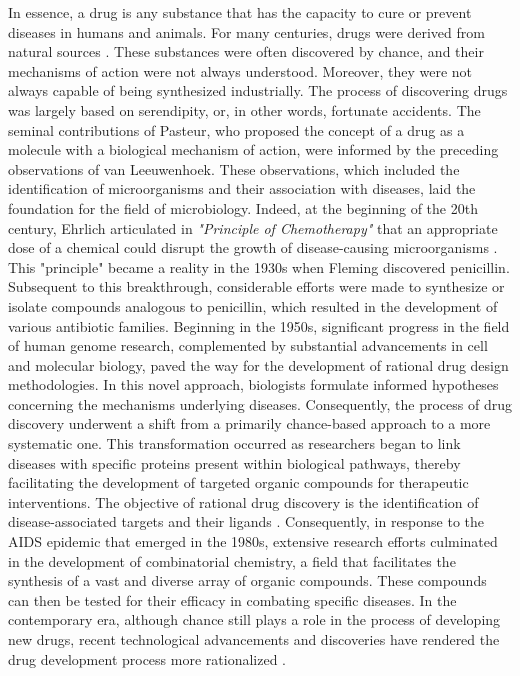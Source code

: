 In essence, a drug is any substance that has the capacity to cure or prevent diseases in humans and animals. For many centuries, drugs were derived from natural sources \cite{Schedler2006}. These substances were often discovered by chance, and their mechanisms of action were not always understood. Moreover, they were not always capable of being synthesized industrially. The process of discovering drugs was largely based on serendipity, or, in other words, fortunate accidents. The seminal contributions of Pasteur, who proposed the concept of a drug as a molecule with a biological mechanism of action, were informed by the preceding observations of van Leeuwenhoek. These observations, which included the identification of microorganisms and their association with diseases, laid the foundation for the field of microbiology. Indeed, at the beginning of the 20th century, Ehrlich articulated in \emph{"Principle of Chemotherapy"} that an appropriate dose of a chemical could disrupt the growth of disease-causing microorganisms \cite{Alizon2018}. This "principle" became a reality in the 1930s when Fleming discovered penicillin. Subsequent to this breakthrough, considerable efforts were made to synthesize or isolate compounds analogous to penicillin, which resulted in the development of various antibiotic families. Beginning in the 1950s, significant progress in the field of human genome research, complemented by substantial advancements in cell and molecular biology, paved the way for the development of rational drug design methodologies. In this novel approach, biologists formulate informed hypotheses concerning the mechanisms underlying diseases. Consequently, the process of drug discovery underwent a shift from a primarily chance-based approach to a more systematic one. This transformation occurred as researchers began to link diseases with specific proteins present within biological pathways, thereby facilitating the development of targeted organic compounds for therapeutic interventions. The objective of rational drug discovery is the identification of disease-associated targets and their ligands \cite{Kubinyi2003}. Consequently, in response to the AIDS epidemic that emerged in the 1980s, extensive research efforts culminated in the development of combinatorial chemistry, a field that facilitates the synthesis of a vast and diverse array of organic compounds. These compounds can then be tested for their efficacy in combating specific diseases. In the contemporary era, although chance still plays a role in the process of developing new drugs, recent technological advancements and discoveries have rendered the drug development process more rationalized \cite{Galloway2010}.

